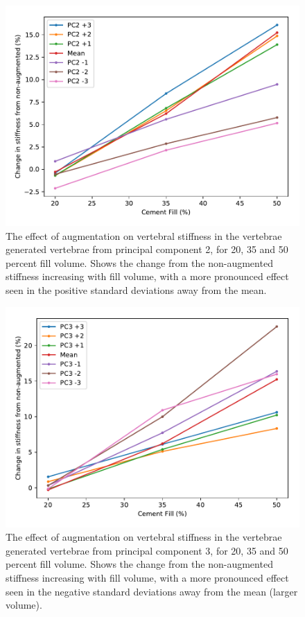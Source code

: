 \begin{figure}[h]
  \centering
  \includegraphics[width=.9\textwidth]{Chapters/Chapter_PCA_images/pca_percent_fill_pc2.pdf}
  \caption[Effect of augmentation in principal component 2.]{The effect of
	augmentation on vertebral stiffness in the vertebrae generated
	vertebrae from principal component 2, for 20, 35 and 50 percent fill
	volume. Shows the change from the non-augmented stiffness increasing
	with fill volume, with a more pronounced effect seen in the positive
	standard deviations away from the mean.}
	\label{fig:pca_percent_fill_pc2}
\end{figure}

\begin{figure}[h]
  \centering
  \includegraphics[width=.9\textwidth]{Chapters/Chapter_PCA_images/pca_percent_fill_pc3.pdf}
  \caption[Effect of augmentation in principal component 3.]{The effect of
	augmentation on vertebral stiffness in the vertebrae generated
	vertebrae from principal component 3, for 20, 35 and 50 percent fill
	volume. Shows the change from the non-augmented stiffness increasing
	with fill volume, with a more pronounced effect seen in the negative
	standard deviations away from the mean (larger volume).}
  \label{fig:pca_percent_fill_pc3}
\end{figure}


